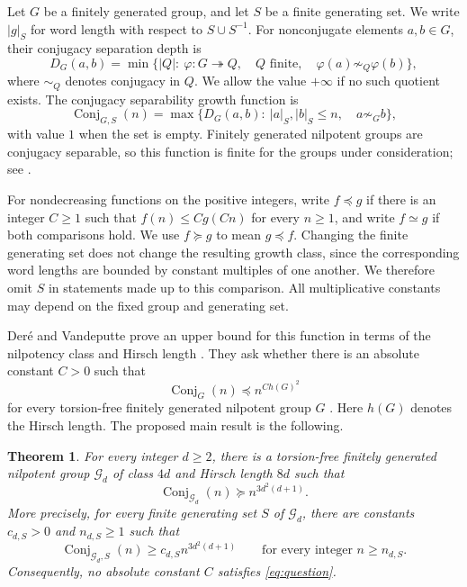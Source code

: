 \documentclass[11pt]{article}
\numberwithin{equation}{section}
\newtheorem{theorem}{Theorem}[section]
\theoremstyle{remark}
\newcommand{\Conj}{\operatorname{Conj}}
\newcommand{\Gp}{\mathcal G}
\begin{document}
Let $G$ be a finitely generated group, and let $S$ be a finite generating
set. We write $|g|_S$ for word length with respect to $S\cup S^{-1}$.
For nonconjugate elements $a,b\in G$, their conjugacy separation depth is
\[
 D_G(a,b)=\min\bigl\{|Q|:\ \varphi:G\twoheadrightarrow Q,\quad
 Q\text{ finite},\quad \varphi(a)\not\sim_Q\varphi(b)\bigr\},
\]
where $\sim_Q$ denotes conjugacy in $Q$. We allow the value $+\infty$
if no such quotient exists. The conjugacy separability growth function is
\[
 \Conj_{G,S}(n)=\max\bigl\{D_G(a,b):\ |a|_S,|b|_S\le n,
 \quad a\not\sim_G b\bigr\},
\]
with value $1$ when the set is empty. Finitely generated nilpotent groups
are conjugacy separable, so this function is finite for the groups under
consideration; see \cite[Introduction]{DV}.

For nondecreasing functions on the positive integers, write $f\preceq g$
if there is an integer $C\ge1$ such that $f(n)\le Cg(Cn)$ for every
$n\ge1$, and write $f\simeq g$ if both comparisons hold. We use
$f\succeq g$ to mean $g\preceq f$. Changing the finite generating set
does not change the resulting growth class, since the corresponding word
lengths are bounded by constant multiples of one another. We therefore
omit $S$ in statements made up to this comparison. All multiplicative
constants may depend on the fixed group and generating set.

Der\'e and Vandeputte prove an upper bound for this function in terms of
the nilpotency class and Hirsch length \cite[Theorem~A]{DV}. They ask
whether there is an absolute constant $C>0$ such that
\begin{equation}\label{eq:question}
 \Conj_G(n)\preceq n^{C h(G)^2}
\end{equation}
for every torsion-free finitely generated nilpotent group $G$
\cite[Question~1, Section~3.2]{DV}. Here $h(G)$ denotes the Hirsch length.
The proposed main result is the following.

\begin{theorem}\label{thm:main}
For every integer $d\ge2$, there is a torsion-free finitely generated
nilpotent group $\Gp_d$ of class $4d$ and Hirsch length $8d$ such that
\[
 \Conj_{\Gp_d}(n)\succeq n^{3d^2(d+1)}.
\]
More precisely, for every finite generating set $S$ of $\Gp_d$, there
are constants $c_{d,S}>0$ and $n_{d,S}\ge1$ such that
\[
 \Conj_{\Gp_d,S}(n)\ge c_{d,S} n^{3d^2(d+1)}
 \qquad\text{for every integer }n\ge n_{d,S}.
\]
Consequently, no absolute constant $C$ satisfies \eqref{eq:question}.
\end{theorem}
\end{document}
